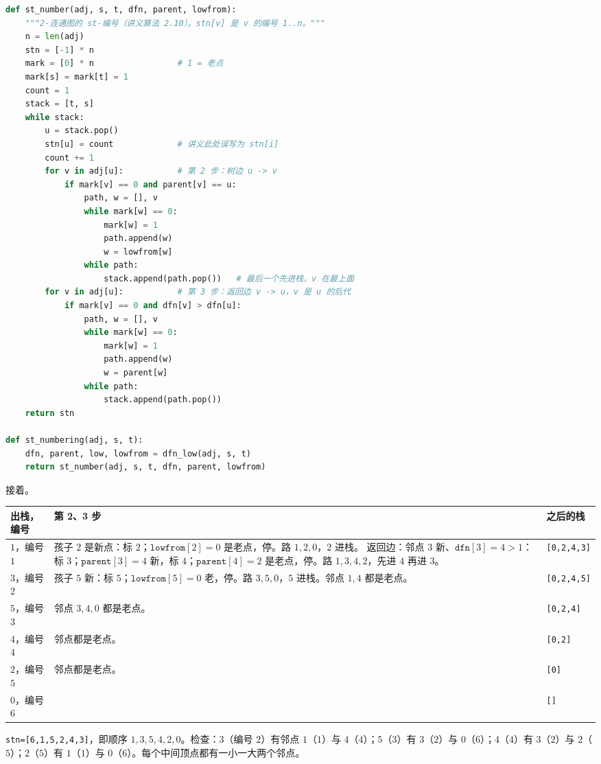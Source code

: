 \begin{lstlisting}[language=Python]
def st_number(adj, s, t, dfn, parent, lowfrom):
    """2-连通图的 st-编号（讲义算法 2.10）。stn[v] 是 v 的编号 1..n。"""
    n = len(adj)
    stn = [-1] * n
    mark = [0] * n                 # 1 = 老点
    mark[s] = mark[t] = 1
    count = 1
    stack = [t, s]
    while stack:
        u = stack.pop()
        stn[u] = count             # 讲义此处误写为 stn[i]
        count += 1
        for v in adj[u]:           # 第 2 步：树边 u -> v
            if mark[v] == 0 and parent[v] == u:
                path, w = [], v
                while mark[w] == 0:
                    mark[w] = 1
                    path.append(w)
                    w = lowfrom[w]
                while path:
                    stack.append(path.pop())   # 最后一个先进栈，v 在最上面
        for v in adj[u]:           # 第 3 步：返回边 v -> u，v 是 u 的后代
            if mark[v] == 0 and dfn[v] > dfn[u]:
                path, w = [], v
                while mark[w] == 0:
                    mark[w] = 1
                    path.append(w)
                    w = parent[w]
                while path:
                    stack.append(path.pop())
    return stn

def st_numbering(adj, s, t):
    dfn, parent, low, lowfrom = dfn_low(adj, s, t)
    return st_number(adj, s, t, dfn, parent, lowfrom)
\end{lstlisting}

\begin{example}\label{ex:st-numbering:run}
接着。
\begin{center}
\small
\begin{tabular}{p{1.7cm}p{8.6cm}l}
\toprule
出栈，编号 & 第 2、3 步 & 之后的栈 \\
\midrule
$1$，编号 $1$ & 孩子 $2$ 是新点：标 $2$；$\texttt{lowfrom}[2]=0$ 是老点，停。路 $1,2,0$，$2$ 进栈。\newline
返回边：邻点 $3$ 新、$\texttt{dfn}[3]=4>1$：标 $3$；$\texttt{parent}[3]=4$ 新，标 $4$；$\texttt{parent}[4]=2$ 是老点，停。路 $1,3,4,2$，先进 $4$ 再进 $3$。 & \texttt{[0,2,4,3]} \\
$3$，编号 $2$ & 孩子 $5$ 新：标 $5$；$\texttt{lowfrom}[5]=0$ 老，停。路 $3,5,0$，$5$ 进栈。邻点 $1,4$ 都是老点。 & \texttt{[0,2,4,5]} \\
$5$，编号 $3$ & 邻点 $3,4,0$ 都是老点。 & \texttt{[0,2,4]} \\
$4$，编号 $4$ & 邻点都是老点。 & \texttt{[0,2]} \\
$2$，编号 $5$ & 邻点都是老点。 & \texttt{[0]} \\
$0$，编号 $6$ & & \texttt{[]} \\
\bottomrule
\end{tabular}
\end{center}
\texttt{stn=[6,1,5,2,4,3]}，即顺序 $1,3,5,4,2,0$。检查：$3$（编号 $2$）有邻点 $1$（$1$）与 $4$（$4$）；$5$（$3$）有 $3$（$2$）与 $0$（$6$）；$4$（$4$）有 $3$（$2$）与 $2$（$5$）；$2$（$5$）有 $1$（$1$）与 $0$（$6$）。每个中间顶点都有一小一大两个邻点。
\end{example}

